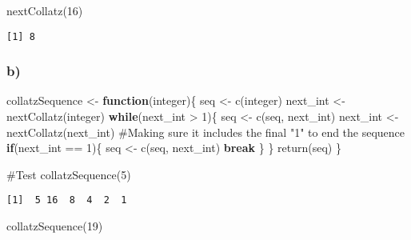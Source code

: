 \documentclass[
  letterpaper,
  DIV=11,
  numbers=noendperiod]{scrartcl}
\newenvironment{Shaded}{\begin{snugshade}}{\end{snugshade}}
\newcommand{\CommentTok}[1]{\textcolor[rgb]{0.37,0.37,0.37}{#1}}
\newcommand{\ControlFlowTok}[1]{\textcolor[rgb]{0.00,0.23,0.31}{\textbf{#1}}}
\newcommand{\DecValTok}[1]{\textcolor[rgb]{0.68,0.00,0.00}{#1}}
\newcommand{\FunctionTok}[1]{\textcolor[rgb]{0.28,0.35,0.67}{#1}}
\newcommand{\NormalTok}[1]{\textcolor[rgb]{0.00,0.23,0.31}{#1}}
\newcommand{\OtherTok}[1]{\textcolor[rgb]{0.00,0.23,0.31}{#1}}
\newcommand{\SpecialCharTok}[1]{\textcolor[rgb]{0.37,0.37,0.37}{#1}}
\begin{document}
\begin{Shaded}
\begin{Highlighting}[]
\FunctionTok{nextCollatz}\NormalTok{(}\DecValTok{16}\NormalTok{)}
\end{Highlighting}
\end{Shaded}

\begin{verbatim}
[1] 8
\end{verbatim}

\subsubsection{b)}\label{b-2}

\begin{Shaded}
\begin{Highlighting}[]
\NormalTok{collatzSequence }\OtherTok{\textless{}{-}} \ControlFlowTok{function}\NormalTok{(integer)\{}
\NormalTok{  seq }\OtherTok{\textless{}{-}} \FunctionTok{c}\NormalTok{(integer)}
\NormalTok{  next\_int }\OtherTok{\textless{}{-}} \FunctionTok{nextCollatz}\NormalTok{(integer)}
  \ControlFlowTok{while}\NormalTok{(next\_int }\SpecialCharTok{\textgreater{}} \DecValTok{1}\NormalTok{)\{}
\NormalTok{    seq }\OtherTok{\textless{}{-}} \FunctionTok{c}\NormalTok{(seq, next\_int)}
\NormalTok{    next\_int }\OtherTok{\textless{}{-}} \FunctionTok{nextCollatz}\NormalTok{(next\_int)}
    \CommentTok{\#Making sure it includes the final "1" to end the sequence}
    \ControlFlowTok{if}\NormalTok{(next\_int }\SpecialCharTok{==} \DecValTok{1}\NormalTok{)\{}
\NormalTok{      seq }\OtherTok{\textless{}{-}} \FunctionTok{c}\NormalTok{(seq, next\_int)}
      \ControlFlowTok{break}
\NormalTok{    \}}
\NormalTok{  \}}
  \FunctionTok{return}\NormalTok{(seq)}
\NormalTok{\}}

\CommentTok{\#Test}
\FunctionTok{collatzSequence}\NormalTok{(}\DecValTok{5}\NormalTok{)}
\end{Highlighting}
\end{Shaded}

\begin{verbatim}
[1]  5 16  8  4  2  1
\end{verbatim}

\begin{Shaded}
\begin{Highlighting}[]
\FunctionTok{collatzSequence}\NormalTok{(}\DecValTok{19}\NormalTok{)}
\end{Highlighting}
\end{Shaded}
\end{document}
